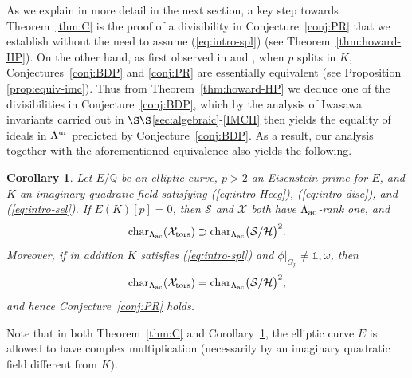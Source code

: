 \documentclass[10pt]{amsart}
\numberwithin{equation}{section}
\newtheorem{cor}[theorem]{Corollary}
\theoremstyle{definition}
\theoremstyle{remark}
\begin{document}
As we explain in more detail in the next section, a key step towards Theorem~\ref{thm:C} is the proof of a divisibility in  Conjecture~\ref{conj:PR} that we establish without the need to assume (\ref{eq:intro-spl}) (see Theorem~\ref{thm:howard-HP}). On the other hand, as first observed in \cite{castella-PhD} and \cite{wan-heegner}, when $p$ splits in $K$, Conjectures~\ref{conj:BDP} and \ref{conj:PR} are essentially equivalent (see Proposition \ref{prop:equiv-imc}). Thus from Theorem~\ref{thm:howard-HP} we deduce one of the divisibilities in Conjecture~\ref{conj:BDP}, which by the analysis of Iwasawa invariants carried out in $\S\S$\ref{sec:algebraic}-\ref{IMCII} then yields the equality of ideals in $\Lambda^{\rm ur}$ predicted by Conjecture~\ref{conj:BDP}. As a result, our analysis together with the aforementioned equivalence also yields the following.


\begin{cor}\label{cor:D}
Let $E/\mathbb{Q}$ be an elliptic curve, $p>2$ an Eisenstein prime for $E$, and $K$ an imaginary quadratic field satisfying {\rm (\ref{eq:intro-Heeg})}, {\rm (\ref{eq:intro-disc})}, and
{\rm (\ref{eq:intro-sel})}. If $E(K)[p]=0$, then $\mathcal{S}$ and $\mathcal{X}$ both
have $\Lambda_{\rm ac}$-rank one, and
\[
{\rm char}_{\Lambda_{\rm ac}}(\mathcal{X}_{\rm tors})\supset{\rm char}_{\Lambda_{\rm ac}}\bigl(\mathcal{S}/\mathcal{H}\bigr)^2.
\] 
Moreover, if in addition $K$ satisfies {\rm (\ref{eq:intro-spl})} and $\phi\vert_{G_p}\neq\mathds{1},\omega$, then
\[
{\rm char}_{\Lambda_{\rm ac}}(\mathcal{X}_{\rm tors})={\rm char}_{\Lambda_{\rm ac}}\bigl(\mathcal{S}/\mathcal{H}\bigr)^2,
\] 
and hence Conjecture~\ref{conj:PR} holds.
\end{cor}


Note that in both Theorem~\ref{thm:C} and Corollary~\ref{cor:D}, the elliptic curve $E$ is allowed to have complex multiplication  (necessarily by an imaginary quadratic field different from $K$). 
\end{document}
